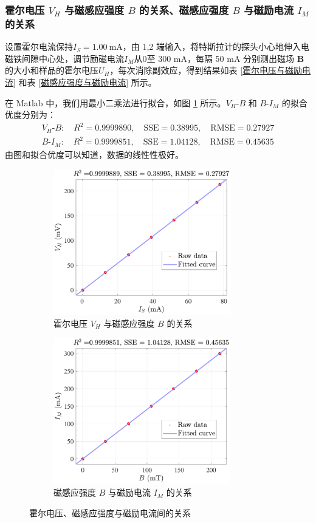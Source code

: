 \documentclass[UTF8]{article}
\theoremstyle{MyLineTheoremStyle} %
\theoremstyle{MyBlockTheoremStyle} %
\theoremstyle{MySubsubsectionStyle} %
\begin{document}
\subsubsection{霍尔电压 $V_H$ 与磁感应强度 $B$ 的关系、磁感应强度 $B$ 与磁励电流 $I_M$ 的关系}
设置霍尔电流保持$ I_S = 1.00 \ \mathrm{mA}$，由 1,2 端输入，将特斯拉计的探头小心地伸入电磁铁间隙中心处，调节励磁电流$ I_M $从$ 0 $至 300 mA，每隔 50 mA 分别测出磁场 $\boldsymbol{B}$ 的大小和样品的霍尔电压$ U_H $，每次消除副效应，得到结果如表 \ref{霍尔电压与磁励电流} 和表 \ref{磁感应强度与磁励电流} 所示。


在 Matlab 中，我们用最小二乘法进行拟合，如图 \ref{霍尔电压、磁感应强度与磁励电流间的关系} 所示。$V_H$-$B$ 和 $B$-$I_M$ 的拟合优度分别为：
\begin{gather}
V_H \text{-} B: \quad R^2 = 0.9999890,\quad \text{SSE} = 0.38995,\quad  \text{RMSE} = 0.27927 \\
B \text{-} I_M: \quad R^2 = 0.9999851,\quad \text{SSE} = 1.04128,\quad  \text{RMSE} = 0.45635
\end{gather}
由图和拟合优度可以知道，数据的线性性极好。
\begin{figure}[H]\centering
\begin{subfigure}[b]{0.5\columnwidth}\centering
    \includegraphics[height=180pt]{assets/1/2.pdf}
    \caption{霍尔电压 $V_H$ 与磁感应强度 $B$ 的关系}
\end{subfigure}\hfill
\begin{subfigure}[b]{0.5\columnwidth}\centering
    \includegraphics[height=180pt]{assets/1/3.pdf}
    \caption{磁感应强度 $B$ 与磁励电流 $I_M$ 的关系}
\end{subfigure}
\caption{霍尔电压、磁感应强度与磁励电流间的关系}
\label{霍尔电压、磁感应强度与磁励电流间的关系}
\end{figure}
\end{document}
